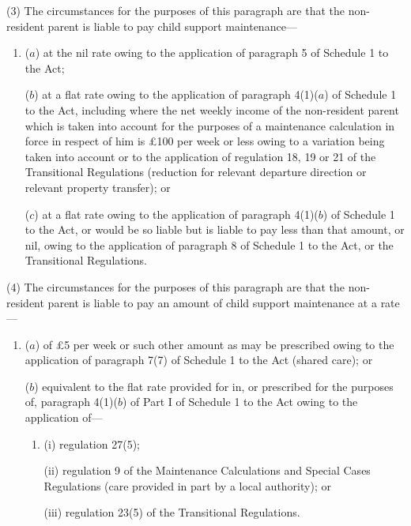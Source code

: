 \documentclass[12pt,a4paper]{article}
\begin{document}
(3) The circumstances for the purposes of this paragraph are that the non-resident parent is liable to pay child support maintenance—
\begin{enumerate}\item[]
($a$) at the nil rate owing to the application of paragraph 5 of Schedule 1 to the Act;

($b$) at a flat rate owing to the application of paragraph 4(1)($a$)  of Schedule 1 to the Act, including where the net weekly income of the non-resident parent which is taken into account for the purposes of a maintenance calculation in force in respect of him is £100 per week or less owing to a variation being taken into account or to the application of regulation 18, 19 or 21 of the Transitional Regulations (reduction for relevant departure direction or relevant property transfer); or

($c$) at a flat rate owing to the application of paragraph 4(1)($b$)  of Schedule 1 to the Act, or would be so liable but is liable to pay less than that amount, or nil, owing to the application of paragraph 8 of Schedule 1 to the Act, or the Transitional Regulations.
\end{enumerate}

(4) The circumstances for the purposes of this paragraph are that the non-resident parent is liable to pay an amount of child support maintenance at a rate—
\begin{enumerate}\item[]
($a$) of £5 per week or such other amount as may be prescribed owing to the application of paragraph 7(7) of Schedule 1 to the Act (shared care); or

($b$) equivalent to the flat rate provided for in, or prescribed for the purposes of, paragraph 4(1)($b$)  of Part I of Schedule 1 to the Act owing to the application of—
\begin{enumerate}\item[]
(i) regulation 27(5);

(ii) regulation 9 of the Maintenance Calculations and Special Cases Regulations (care provided in part by a local authority); or

(iii) regulation 23(5) of the Transitional Regulations.
\end{enumerate}
\end{enumerate}
\end{document}
